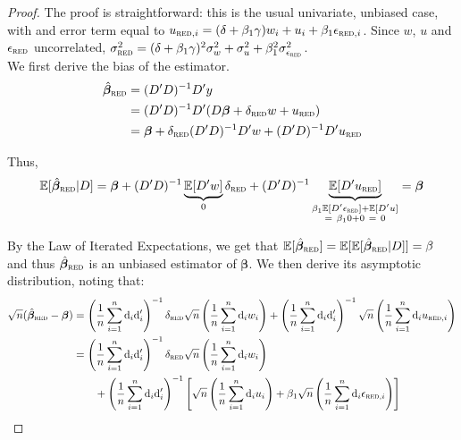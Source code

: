 \documentclass[a4paper, 11pt]{report}
\begin{document}
			\begin{proof}
				The proof is straightforward: this is the usual univariate, unbiased case, with and error term equal to $u_{\textsc{red}, i} = (\delta + \beta_{1}\gamma) w_{i} + u_{i} + \beta_{1}\epsilon_{\textsc{red}, i}$. Since $w$, $u$ and $\epsilon_{\textsc{red}}$ uncorrelated, $\sigma_{\textsc{red}}^{2} = (\delta + \beta_{1}\gamma)^{2} \sigma_{w}^{2} + \sigma_{u}^{2} + \beta_{1}^{2}\sigma_{\epsilon_{\textsc{red}}}^{2}$.\\
			
			
			We first derive the bias of the estimator.
			~
			\begin{align*}
				 \hat{\bm{\beta}}_{\textsc{red}} & =  (D'D)^{-1}D'y\\
				 	& = (D'D)^{-1}D'(D\bm{\beta} + \delta_{\textsc{red}} w + u_{\textsc{red}})\\
				 	& = \bm{\beta} + \delta_{\textsc{red}} (D'D)^{-1}D'w  + (D'D)^{-1}D'u_{\textsc{red}}
			\end{align*}
			
			Thus,
			~
			\begin{equation*}
				\mathbb{E}[ \hat{\bm{\beta}}_{\textsc{red}} | D]  =  
					\bm{\beta} + (D'D)^{-1}\underbrace{\mathbb{E}[D'w]}_{0} \delta_{\textsc{red}} + (D'D)^{-1}\underbrace{\mathbb{E}[D'u_{\textsc{red}}]}_{\substack{\beta_{1}\mathbb{E}[D'\epsilon_{\textsc{red}}] + \mathbb{E}[D'u] \\ = \  \beta_{1} 0 + 0 \ = \ 0}} = \bm{\beta}
			\end{equation*}
			
			By the Law of Iterated Expectations, we get that $\mathbb{E}[ \hat{\bm{\beta}}_{\textsc{red}}] = \mathbb{E}[\mathbb{E}[ \hat{\bm{\beta}}_{\textsc{red}}| D]] = \beta$ and thus $\hat{\bm{\beta}}_{\textsc{red}}$ is an unbiased estimator of $\bm{\beta}$. We then derive its asymptotic distribution, noting that:
			~
				\begin{align*}
					\sqrt{n}(\hat{\bm{\beta}}_{\textsc{red}} - \bm{\beta}) 
						& = \left(\dfrac{1}{n} \sum_{i = 1}^{n} \text{d}_{i} \text{d}_{i}' \right)^{-1}  \delta_{\textsc{red}}  \sqrt{n} \left(\dfrac{1}{n} \sum_{i = 1}^{n} \text{d}_{i} w_{i} \right) 
							+ \left(\dfrac{1}{n} \sum_{i = 1}^{n} \text{d}_{i} \text{d}_{i}' \right)^{-1}  \sqrt{n} \left(\dfrac{1}{n} \sum_{i = 1}^{n} \text{d}_{i} u_{\textsc{red}, i} \right) \\
						& = \left(\dfrac{1}{n} \sum_{i = 1}^{n} \text{d}_{i} \text{d}_{i}' \right)^{-1}  \delta_{\textsc{red}}  \sqrt{n} \left(\dfrac{1}{n} \sum_{i = 1}^{n} \text{d}_{i} w_{i} \right) \\
							& \qquad + \left(\dfrac{1}{n} \sum_{i = 1}^{n} \text{d}_{i} \text{d}_{i}' \right)^{-1}  \left[ \sqrt{n} \left(\dfrac{1}{n} \sum_{i = 1}^{n} \text{d}_{i} u_{i} \right) +  \beta_{1} \sqrt{n} \left(\dfrac{1}{n} \sum_{i = 1}^{n} \text{d}_{i} \epsilon_{\textsc{red}, i} \right)  \right]
				\end{align*}	
				

\end{proof}
\end{document}
